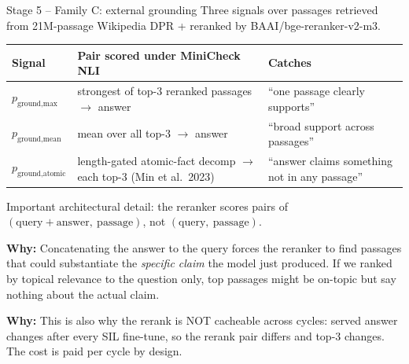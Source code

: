 \documentclass[10pt,aspectratio=169]{beamer}
\newcommand{\why}[1]{{\color{caemamber}\textbf{Why:}} #1}
\begin{document}
\begin{frame}{Stage 5 -- Family C: external grounding}
  \scriptsize
  Three signals over passages retrieved from 21M-passage Wikipedia DPR + reranked by BAAI/bge-reranker-v2-m3.

  \vspace{0.3em}
  \begin{tabular}{@{}lp{6cm}p{3.5cm}@{}}
    \toprule
    Signal & Pair scored under MiniCheck NLI & Catches \\
    \midrule
    $p_{\text{ground,max}}$ & strongest of top-3 reranked passages $\to$ answer & ``one passage clearly supports'' \\
    $p_{\text{ground,mean}}$ & mean over all top-3 $\to$ answer & ``broad support across passages'' \\
    $p_{\text{ground,atomic}}$ & length-gated atomic-fact decomp $\to$ each top-3 (Min et al.\ 2023) & ``answer claims something not in any passage'' \\
    \bottomrule
  \end{tabular}

  \vspace{0.4em}
  \alert{Important architectural detail:} the reranker scores pairs of $(\text{query} + \text{answer},\ \text{passage})$, not $(\text{query},\ \text{passage})$.

  \why{Concatenating the answer to the query forces the reranker to find passages that could substantiate the \emph{specific claim} the model just produced. If we ranked by topical relevance to the question only, top passages might be on-topic but say nothing about the actual claim.}

  \why{This is also why the rerank is NOT cacheable across cycles: served answer changes after every SIL fine-tune, so the rerank pair differs and top-3 changes. The cost is paid per cycle by design.}
\end{frame}
\end{document}
